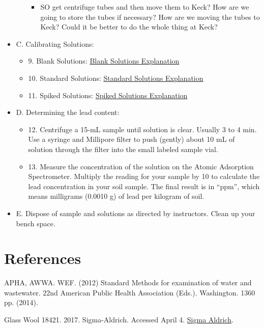 \documentclass[12pt]{../SOP2}
\begin{document}
\begin{itemize}
\begin{itemize}
    \begin{itemize}
      \item SO get centrifuge tubes and then move them to Keck?
  How are we going to store the tubes if necessary?
  How are we moving the tubes to Keck?
  Could it be better to do the whole thing at Keck?
    \end{itemize}  
  \end{itemize}
  \item C. Calibrating Solutions:
  \begin{itemize}
    \item 9. Blank Solutions: \href{https://en.wikipedia.org/wiki/Blank_(solution)}{Blank Solutions Explanation}
    \item 10. Standard Solutions: \href{http://www1.lasalle.edu/~prushan/Intrumental%20Analysis_files/AA-Perkin%20Elmer%20guide%20to%20all!.pdf}{Standard Solutions Explanation}
    \item 11. Spiked Solutions: \href{}{Spiked Solutions Explanation}
  \end{itemize}  
  \item D. Determining the lead content:
  \begin{itemize}
    \item 12. Centrifuge a 15-mL sample until solution is clear. Usually 3 to 4 min. Use a syringe and Millipore filter to push (gently) about 10 mL of solution through the filter into the small labeled sample vial.
    \item 13. Measure the concentration of the solution on the Atomic Adsorption Spectrometer.  Multiply the reading for your sample by 10 to calculate the lead concentration in your soil sample.  The final result is in “ppm”, which means milligrams (0.0010 g) of lead per kilogram of soil.
  \end{itemize}
  \item E. Dispose of sample and solutions as directed by instructors. Clean up your bench space.
\end{itemize}


\section{References}

\NP APHA, AWWA. WEF. (2012) Standard Methods for examination of water and wastewater. 22nd American Public Health Association (Eds.). Washington. 1360 pp. (2014).

\NP Glass Wool 18421. 2017. Sigma-Aldrich. Accessed April 4. \href{http://www.sigmaaldrich.com/catalog/product/sial/18421}{Sigma Aldrich}.
\end{document}
